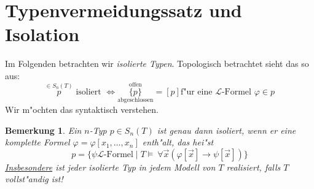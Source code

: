 \documentclass[a4paper,12pt,numbers=noenddot,parskip=full]{scrartcl}
\newcommand{\Forall}{~\forall}
\newcommand{\scrL}{\mathcal{L}}
\theoremstyle{dotless}
\newtheorem{remark}[theorem]{Bemerkung}
\begin{document}
\section{Typenvermeidungssatz und Isolation}
Im Folgenden betrachten wir \emph{isolierte Typen}. Topologisch betrachtet sieht das so aus:
\begin{equation*}
	\overset{\in S_n(T)}{p} \text{ isoliert } \Longleftrightarrow \underset{\text{abgeschlossen}}{\overset{\text{offen}}{\{p\}}} = [p] \text{f"ur eine } \scrL \text{-Formel } \varphi \in p
\end{equation*}
Wir m"ochten das syntaktisch verstehen.
\begin{remark}\label{bem:voll}
	Ein $n$-Typ $p \in S_n(T)$ ist genau dann isoliert, wenn er eine \emph{komplette} Formel $\varphi =\varphi[x_1, \dots, x_n]$ enth"alt, das hei"st
	\begin{equation*}
		p = \{\psi \scrL\text{-Formel} \mid T \models \Forall \vec{x} (\varphi[\vec{x}] \rightarrow \psi[\vec{x}]) \}
	\end{equation*}
	\underline{Insbesondere} ist jeder isolierte Typ in jedem Modell von $T$ realisiert, falls $T$ vollst"andig ist!
\end{remark}
\end{document}
